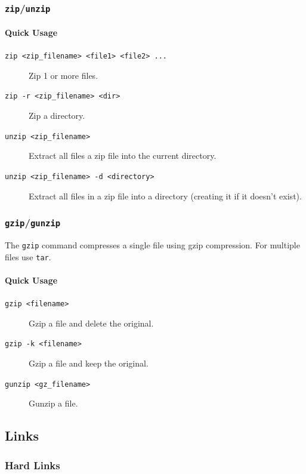 \documentclass{article}
\newcommand{\code}[1]{\texttt{#1}}
\begin{document}
\subsubsection{\code{zip}/\code{unzip}}

\paragraph{Quick Usage}

\begin{description}
    \item[\code{zip <zip\_filename> <file1> <file2> ...}] Zip 1 or more files.
    \item[\code{zip -r <zip\_filename> <dir>}] Zip a directory.
    \item[\code{unzip <zip\_filename>}] Extract all files a zip file into the current directory.
    \item[\code{unzip <zip\_filename> -d <directory>}] Extract all files in a zip file into a directory (creating it if it doesn't exist).
\end{description}

\subsubsection{\code{gzip}/\code{gunzip}}

The \code{gzip} command compresses a single file using gzip compression. For multiple files use \code{tar}.

\paragraph{Quick Usage}

\begin{description}
    \item[\code{gzip <filename>}] Gzip a file and delete the original.
    \item[\code{gzip -k <filename>}] Gzip a file and keep the original.
    \item[\code{gunzip <gz\_filename>}] Gunzip a file.
\end{description}

\subsection{Links}

\subsubsection{Hard Links}
\end{document}

